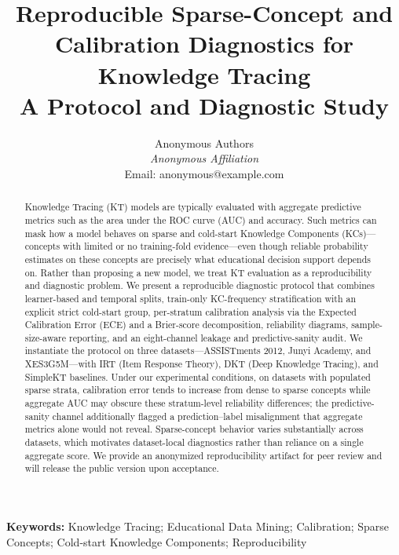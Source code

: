 \documentclass[12pt,a4paper]{jedm}
\begin{document}
\title{\sffamily\bfseries Reproducible Sparse-Concept and Calibration Diagnostics for Knowledge Tracing\\
{\large A Protocol and Diagnostic Study}}

\author{
\sffamily Anonymous Authors\\[8pt]
\normalsize \textit{Anonymous Affiliation}\\
\normalsize Email: anonymous@example.com
}
\date{}

\maketitle

\begin{abstract}
Knowledge Tracing (KT) models are typically evaluated with aggregate predictive metrics such as the area under the ROC curve (AUC) and accuracy. Such metrics can mask how a model behaves on sparse and cold-start Knowledge Components (KCs)---concepts with limited or no training-fold evidence---even though reliable probability estimates on these concepts are precisely what educational decision support depends on. Rather than proposing a new model, we treat KT evaluation as a reproducibility and diagnostic problem. We present a reproducible diagnostic protocol that combines learner-based and temporal splits, train-only KC-frequency stratification with an explicit strict cold-start group, per-stratum calibration analysis via the Expected Calibration Error (ECE) and a Brier-score decomposition, reliability diagrams, sample-size-aware reporting, and an eight-channel leakage and predictive-sanity audit. We instantiate the protocol on three datasets---ASSISTments 2012, Junyi Academy, and XES3G5M---with IRT (Item Response Theory), DKT (Deep Knowledge Tracing), and SimpleKT baselines. Under our experimental conditions, on datasets with populated sparse strata, calibration error tends to increase from dense to sparse concepts while aggregate AUC may obscure these stratum-level reliability differences; the predictive-sanity channel additionally flagged a prediction--label misalignment that aggregate metrics alone would not reveal. Sparse-concept behavior varies substantially across datasets, which motivates dataset-local diagnostics rather than reliance on a single aggregate score. We provide an anonymized reproducibility artifact for peer review and will release the public version upon acceptance.
\end{abstract}

\vspace{10pt}
\noindent\textbf{Keywords:} Knowledge Tracing; Educational Data Mining; Calibration; Sparse Concepts; Cold-start Knowledge Components; Reproducibility
\end{document}
